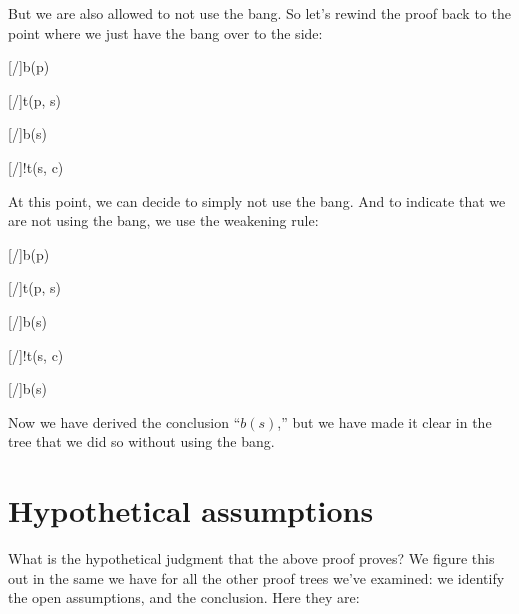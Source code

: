 \documentclass[../../../main.tex]{subfiles}
\begin{document}
\noindent
But we are also allowed to not use the bang. So let's rewind the proof back to the point where we just have the bang over to the side:

\begin{prooftree*}
  \hypo{}
  [\startrule/]{b(p)}
  
  \hypo{}
  [\startrule/]{t(p, s)}
  
  [\traderule/]{b(s)}
  
  \hypo{}
  [\startrule/]{!t(s, c)}
  
\end{prooftree*}

\noindent
At this point, we can decide to simply not use the bang. And to indicate that we are not using the bang, we use the weakening rule:

\begin{prooftree*}
  \hypo{}
  [\startrule/]{b(p)}
  
  \hypo{}
  [\startrule/]{t(p, s)}
  
  [\traderule/]{b(s)}
  
  \hypo{}
  [\startrule/]{!t(s, c)}
  
  [\bangWeak/]{b(s)}
\end{prooftree*}

\noindent
Now we have derived the conclusion ``$b(s)$,'' but we have made it clear in the tree that we did so without using the bang.


\section{Hypothetical assumptions}

What is the hypothetical judgment that the above proof proves? We figure this out in the same we have for all the other proof trees we've examined: we identify the open assumptions, and the conclusion. Here they are:
\end{document}

